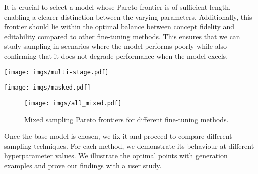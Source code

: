 
It is crucial to select a model whose Pareto frontier is of sufficient length, enabling a clearer distinction between the varying parameters. Additionally, this frontier should lie within the optimal balance between concept fidelity and editability compared to other fine-tuning methods. This ensures that we can study sampling in scenarios where the model performs poorly while also confirming that it does not degrade performance when the model excels.

\begin{figure*}[ht!]
\centering
\begin{minipage}{.477\textwidth}
  \centering
  \texttt{[image: imgs/multi-stage.pdf]}
  \vspace{-0.19in}
  \label{fig:multi-stage}
\end{minipage}%
\hfill
\begin{minipage}{.477\textwidth}
  \centering
  \texttt{[image: imgs/masked.pdf]}
  \vspace{-0.19in}
  \label{fig:masked}
\end{minipage}
\vspace{-0.19in}
\end{figure*}

\begin{figure}[h!]
    \texttt{[image: imgs/all\_mixed.pdf]}
  \vspace{-0.23in}
    \caption{Mixed sampling Pareto frontiers for different fine-tuning methods.}
    \label{fig:all_mixed}
    \vspace{-0.24in}
\end{figure}
Once the base model is chosen, we fix it and proceed to compare different sampling techniques. For each method, we demonstrate its behaviour at different hyperparameter values. We illustrate the optimal points with generation examples and prove our findings with a user study.

